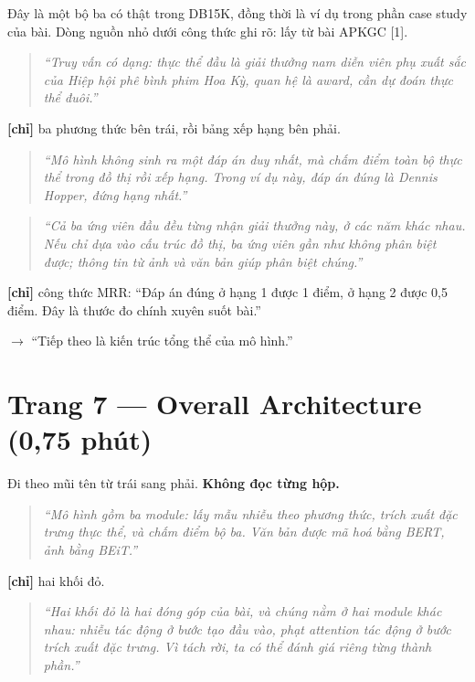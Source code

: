 \documentclass[11pt,a4paper]{article}
\begin{document}
Đây là một bộ ba có thật trong DB15K, đồng thời là ví dụ trong phần case study của bài. Dòng nguồn nhỏ dưới công thức ghi rõ: lấy từ bài APKGC [1].


\begin{quote}\itshape ``Truy vấn có dạng: thực thể đầu là giải thưởng nam diễn viên phụ xuất sắc của Hiệp hội phê bình phim Hoa Kỳ, quan hệ là \emph{award}, cần dự đoán thực thể đuôi.''\end{quote}

\textbf{[chỉ]} ba phương thức bên trái, rồi bảng xếp hạng bên phải.


\begin{quote}\itshape ``Mô hình không sinh ra một đáp án duy nhất, mà chấm điểm \emph{toàn bộ} thực thể trong đồ thị rồi xếp hạng. Trong ví dụ này, đáp án đúng là Dennis Hopper, đứng hạng nhất.''\end{quote}

\begin{quote}\itshape ``Cả ba ứng viên đầu đều từng nhận giải thưởng này, ở các năm khác nhau. Nếu chỉ dựa vào cấu trúc đồ thị, ba ứng viên gần như không phân biệt được; thông tin từ ảnh và văn bản giúp phân biệt chúng.''\end{quote}

\textbf{[chỉ]} công thức MRR: ``Đáp án đúng ở hạng 1 được 1 điểm, ở hạng 2 được 0,5 điểm. Đây là thước đo chính xuyên suốt bài.''


\textbf{$\to$} ``Tiếp theo là kiến trúc tổng thể của mô hình.''


\section*{Trang 7 --- Overall Architecture (0,75 phút)}

Đi theo mũi tên từ trái sang phải. \textbf{Không đọc từng hộp.}


\begin{quote}\itshape ``Mô hình gồm ba module: lấy mẫu nhiễu theo phương thức, trích xuất đặc trưng thực thể, và chấm điểm bộ ba. Văn bản được mã hoá bằng BERT, ảnh bằng BEiT.''\end{quote}

\textbf{[chỉ]} hai khối đỏ.


\begin{quote}\itshape ``Hai khối đỏ là hai đóng góp của bài, và chúng nằm ở hai module khác nhau: nhiễu tác động ở bước \emph{tạo đầu vào}, phạt attention tác động ở bước \emph{trích xuất đặc trưng}. Vì tách rời, ta có thể đánh giá riêng từng thành phần.''\end{quote}
\end{document}

